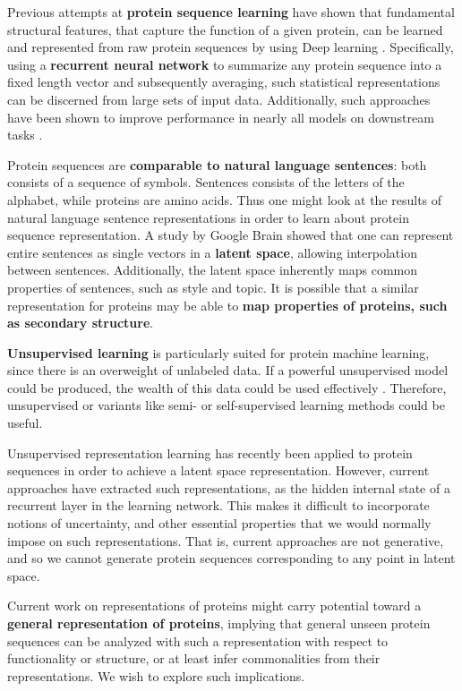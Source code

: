 Previous attempts at \textbf{protein sequence learning} have shown that fundamental structural features, that capture the function of a given protein, can be learned and represented from raw protein sequences by using Deep learning \cite{alley2019unified}. Specifically, using a \textbf{recurrent neural network} to summarize any protein sequence into a fixed length vector and subsequently averaging, such statistical representations can be discerned from large sets of input data. Additionally, such approaches have been shown to improve performance in nearly all models on downstream tasks \cite{rao2019evaluating}.

Protein sequences are \textbf{comparable to natural language sentences}: both consists of a sequence of symbols. Sentences consists of the letters of the alphabet, while proteins are amino acids. Thus one might look at the results of natural language sentence representations in order to learn about protein sequence representation. A study by Google Brain \cite{bowman2015generating} showed that one can represent entire sentences as single vectors in a \textbf{latent space}, allowing interpolation between sentences. Additionally, the latent space inherently maps common properties of sentences, such as style and topic. It is possible that a similar representation for proteins may be able to \textbf{map properties of proteins, such as secondary structure}.

\textbf{Unsupervised learning} is particularly suited for protein machine learning, since there is an overweight of unlabeled data. If a powerful unsupervised model could be produced, the wealth of this data could be used effectively \cite{AlQuraishiUnsupervised}. Therefore, unsupervised or variants like semi- or self-supervised learning methods could be useful.

Unsupervised representation learning has recently been applied to protein sequences \cite{alley2019unified} in order to achieve a latent space representation. However, current approaches have extracted such representations, as the hidden internal state of a recurrent layer in the learning network. This makes it difficult to incorporate notions of uncertainty, and other essential properties that we would normally impose on such representations. That is, current approaches are not generative, and so we cannot generate protein sequences corresponding to any point in latent space.

Current work on representations of proteins might carry potential toward a \textbf{general representation of proteins}, implying that general unseen protein sequences can be analyzed with such a representation with respect to functionality or structure, or at least infer commonalities from their representations. We wish to explore such implications.

